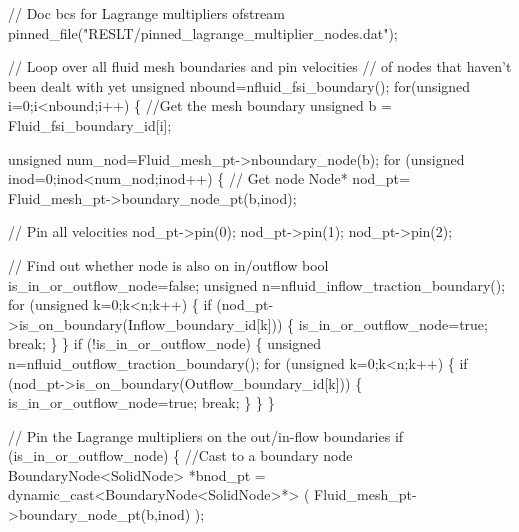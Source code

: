 \begin{DoxyCodeInclude}

 \textcolor{comment}{// Doc bcs for Lagrange multipliers}
 ofstream pinned\_file(\textcolor{stringliteral}{"RESLT/pinned\_lagrange\_multiplier\_nodes.dat"});

 \textcolor{comment}{// Loop over all fluid mesh boundaries and pin velocities}
 \textcolor{comment}{// of nodes that haven't been dealt with yet}
 \textcolor{keywordtype}{unsigned} nbound=nfluid\_fsi\_boundary();
 \textcolor{keywordflow}{for}(\textcolor{keywordtype}{unsigned} i=0;i<nbound;i++)
  \{
   \textcolor{comment}{//Get the mesh boundary}
   \textcolor{keywordtype}{unsigned} b = Fluid\_fsi\_boundary\_id[i];
   
   \textcolor{keywordtype}{unsigned} num\_nod=Fluid\_mesh\_pt->nboundary\_node(b);
   \textcolor{keywordflow}{for} (\textcolor{keywordtype}{unsigned} inod=0;inod<num\_nod;inod++)
    \{
     \textcolor{comment}{// Get node}
     Node* nod\_pt= Fluid\_mesh\_pt->boundary\_node\_pt(b,inod);
     
     \textcolor{comment}{// Pin all velocities}
     nod\_pt->pin(0); 
     nod\_pt->pin(1); 
     nod\_pt->pin(2); 
     
     \textcolor{comment}{// Find out whether node is also on in/outflow}
     \textcolor{keywordtype}{bool} is\_in\_or\_outflow\_node=\textcolor{keyword}{false};
     \textcolor{keywordtype}{unsigned} n=nfluid\_inflow\_traction\_boundary();
     \textcolor{keywordflow}{for} (\textcolor{keywordtype}{unsigned} k=0;k<n;k++)
      \{
       \textcolor{keywordflow}{if} (nod\_pt->is\_on\_boundary(Inflow\_boundary\_id[k]))
        \{
         is\_in\_or\_outflow\_node=\textcolor{keyword}{true};
         \textcolor{keywordflow}{break};
        \}
      \}
     \textcolor{keywordflow}{if} (!is\_in\_or\_outflow\_node)
      \{
       \textcolor{keywordtype}{unsigned} n=nfluid\_outflow\_traction\_boundary();
       \textcolor{keywordflow}{for} (\textcolor{keywordtype}{unsigned} k=0;k<n;k++)
        \{
         \textcolor{keywordflow}{if} (nod\_pt->is\_on\_boundary(Outflow\_boundary\_id[k]))
          \{
           is\_in\_or\_outflow\_node=\textcolor{keyword}{true};
           \textcolor{keywordflow}{break};
          \}
        \}
      \}

     \textcolor{comment}{// Pin the Lagrange multipliers on the out/in-flow boundaries}
     \textcolor{keywordflow}{if} (is\_in\_or\_outflow\_node)
      \{
       \textcolor{comment}{//Cast to a boundary node}
       BoundaryNode<SolidNode> *bnod\_pt = 
        \textcolor{keyword}{dynamic\_cast<}BoundaryNode<SolidNode>*\textcolor{keyword}{>}
        ( Fluid\_mesh\_pt->boundary\_node\_pt(b,inod) );
              

\end{DoxyCodeInclude}
